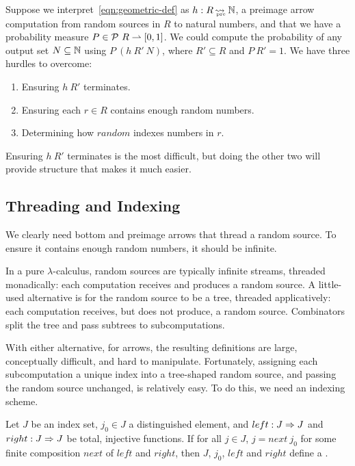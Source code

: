 \documentclass{llncs}
\newcommand{\arrow}{\rightsquigarrow}
\newcommand{\pto}{\rightharpoonup}
\newcommand{\pre}{_\mathrm{pre}}
\DeclareMathOperator{\preto}{\arrow_{\mspace{-19mu}\pre}}
\begin{document}
Suppose we interpret~\eqref{eqn:geometric-def} as $h : R \preto \Nat$, a preimage arrow computation from random sources in $R$ to natural numbers, and that we have a probability measure $P \in \powerset~R \pto [0,1]$.
We could compute the probability of any output set $N \subseteq \mathbb{N}$ using $P~(h~R'~N)$, where $R' \subseteq R$ and $P~R' = 1$. We have three hurdles to overcome:
\begin{enumerate}
	\item Ensuring $h~R'$ terminates.
	\item Ensuring each $r \in R$ contains enough random numbers.
	\item Determining how $random$ indexes numbers in $r$.
\end{enumerate}
Ensuring $h~R'$ terminates is the most difficult, but doing the other two will provide structure that makes it much easier.

\subsection{Threading and Indexing}

We clearly need bottom and preimage arrows that thread a random source.
To ensure it contains enough random numbers, it should be infinite.

In a pure $\lambda$-calculus, random sources are typically infinite streams, threaded monadically: each computation receives and produces a random source.
A little-used alternative is for the random source to be a tree, threaded applicatively: each computation receives, but does not produce, a random source.
Combinators split the tree and pass subtrees to subcomputations.

With either alternative, for arrows, the resulting definitions are large, conceptually difficult, and hard to manipulate.
Fortunately, assigning each subcomputation a unique index into a tree-shaped random source, and passing the random source unchanged, is relatively easy.
To do this, we need an indexing scheme.

\begin{definition}
Let $J$ be an index set, $j_0 \in J$ a distinguished element, and $left : J \Rightarrow J$ and $right : J \Rightarrow J$ be total, injective functions. If for all $j \in J$, $j = next~j_0$ for some finite composition $next$ of $left$ and $right$, then $J$, $j_0$, $left$ and $right$ define a .
\end{definition}
\end{document}
